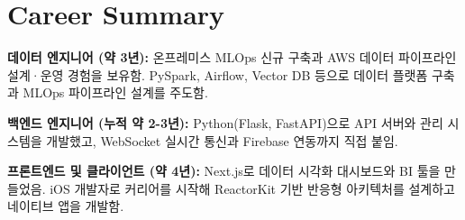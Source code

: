 \section
{Career Summary}
\begin{itemize}[leftmargin=0.15in, label={}]
	\small{\item{
        \textbf{데이터 엔지니어 (약 3년):} 온프레미스 MLOps 신규 구축과 AWS 데이터 파이프라인 설계·운영 경험을 보유함. PySpark, Airflow, Vector DB 등으로 데이터 플랫폼 구축과 MLOps 파이프라인 설계를 주도함.
        }}
        \small{\item{
        \textbf{백엔드 엔지니어 (누적 약 2-3년):} Python(Flask, FastAPI)으로 API 서버와 관리 시스템을 개발했고, WebSocket 실시간 통신과 Firebase 연동까지 직접 붙임.
        }}
        \small{\item{
        \textbf{프론트엔드 및 클라이언트 (약 4년):} Next.js로 데이터 시각화 대시보드와 BI 툴을 만들었음. iOS 개발자로 커리어를 시작해 ReactorKit 기반 반응형 아키텍처를 설계하고 네이티브 앱을 개발함.
        }}
\end{itemize}